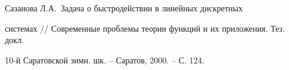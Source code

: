 \vskip 2cm












\label{end}
















Сазанова Л.А.\ Задача о быстродействии в линейных дискретных


системах // Современные проблемы теории функций и их приложения. Тез. докл.


10-й Саратовской зимн. шк. -- Саратов, 2000. -- С. 124.














